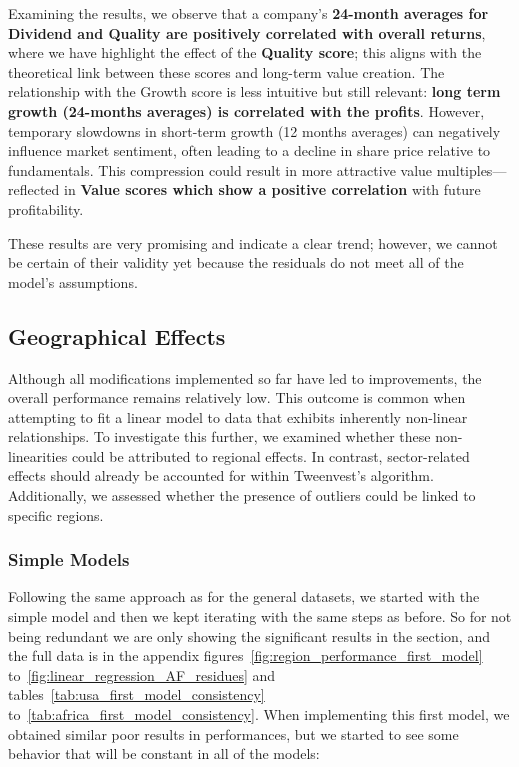 \documentclass[11pt,english,a4paper,hidelinks]{book}
\begin{document}
\noindent Examining the results, we observe that a company's \textbf{24-month averages for Dividend and Quality are positively correlated with overall returns}, where we have highlight the effect of the \textbf{Quality score}; this aligns with the theoretical link between these scores and long-term value creation. The relationship with the Growth score is less intuitive but still relevant: \textbf{long term growth (24-months averages) is correlated with the profits}. However, temporary slowdowns in short-term growth (12 months averages) can negatively influence market sentiment, often leading to a decline in share price relative to fundamentals. This compression could result in more attractive value multiples—reflected in \textbf{Value scores which show a positive correlation} with future profitability.

\noindent These results are very promising and indicate a clear trend; however, we cannot be certain of their validity yet because the residuals do not meet all of the model's assumptions.

\subsection{Geographical Effects}

\noindent Although all modifications implemented so far have led to improvements, the overall performance remains relatively low. This outcome is common when attempting to fit a linear model to data that exhibits inherently non-linear relationships. To investigate this further, we examined whether these non-linearities could be attributed to regional effects. In contrast, sector-related effects should already be accounted for within Tweenvest’s algorithm. Additionally, we assessed whether the presence of outliers could be linked to specific regions.
\subsubsection{Simple Models}

\noindent Following the same approach as for the general datasets, we started with the simple model and then we kept iterating with the same steps as before. So for not being redundant we are only showing the significant results in the section, and the full data is in the appendix figures~\ref{fig:region_performance_first_model} to~\ref{fig:linear_regression_AF_residues} and tables~\ref{tab:usa_first_model_consistency} to~\ref{tab:africa_first_model_consistency}. When implementing this first model, we obtained similar poor results in performances, but we started to see some behavior that will be constant in all of the models:
\end{document}
